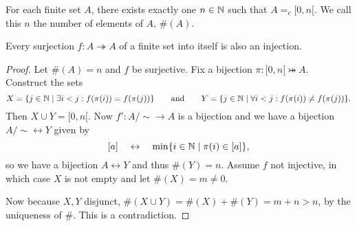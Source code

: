 \begin{corollary}
For each finite set $A$, there exists exactly one $n\in\mathbb{N}$ such that $A =_c [0,n[$. We call this $n$ the number of elements of $A$, $\#(A)$.
\end{corollary}
\begin{corollary}
Every surjection $f:A\twoheadrightarrow A$ of a finite set into itself is also an injection.
\end{corollary}
\begin{proof}
Let $\#(A) = n$ and $f$ be surjective. Fix a bijection $\pi: [0,n[ \twoheadrightarrowtail A$. Construct the sets
\[ X = \{j \in \mathbb{N}\;|\; \exists i<j: f(\pi(i)) = f(\pi(j)) \}\qquad \text{and}\qquad Y = \{j \in \mathbb{N}\;|\; \forall i<j: f(\pi(i)) \neq f(\pi(j)) \}. \]
Then $X\cup Y = [0,n[$. Now $f': A/\sim \to A$ is a bijection and we have a bijection $A/\sim \leftrightarrow Y$ given by
\[ [a] \quad \leftrightarrow \quad \min\{i\in \mathbb{N}\;|\; \pi(i)\in [a]\}, \]
so we have a bijection $A\leftrightarrow Y$ and thus $\#(Y) = n$.
Assume $f$ not injective, in which case $X$ is not empty and let $\#(X) = m \neq 0$.

Now because $X,Y$ disjunct, $\#(X\cup Y) = \#(X)+\#(Y) = m+n >n$, by the uniqueness of $\#$. This is a contradiction.
\end{proof}

